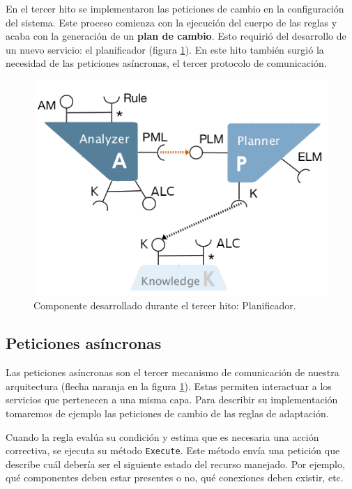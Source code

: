 En el tercer hito se implementaron las peticiones de cambio en la configuración del sistema. Este proceso comienza con la ejecución del cuerpo de las reglas y acaba con la generación de un \textbf{plan de cambio}. Esto requirió del desarrollo de un nuevo servicio: el planificador (figura \ref{fig:hito-3-planificador}). En este hito también surgió la necesidad de las peticiones asíncronas, el tercer protocolo de comunicación.

\begin{figure}[h!]
  \centering
  \includegraphics[scale=0.50]{cap_implementacion/images/hito-3-planificador}
  \caption{Componente desarrollado durante el tercer hito: Planificador.}
  \label{fig:hito-3-planificador}
\end{figure}

\subsection{Peticiones asíncronas}

Las peticiones asíncronas son el tercer mecanismo de comunicación de nuestra arquitectura (flecha naranja en la figura \ref{fig:hito-3-planificador}). Estas permiten interactuar a los servicios que pertenecen a una misma capa. Para describir su implementación tomaremos de ejemplo las peticiones de cambio de las reglas de adaptación.

Cuando la regla evalúa su condición y estima que es necesaria una acción correctiva, se ejecuta su método \texttt{Execute}. Este método envía una petición que describe cuál debería ser el siguiente estado del recurso manejado. Por ejemplo, qué componentes deben estar presentes o no, qué conexiones deben existir, etc.

